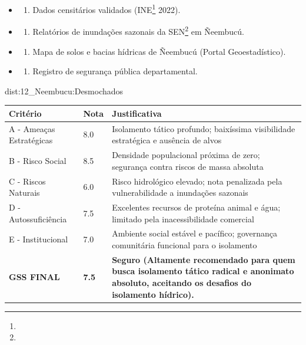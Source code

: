 {\begin{itemize}
\tightlist
\item
  \begin{enumerate}
  \def\labelenumi{\arabic{enumi})}
  \tightlist
  \item
    Dados censitários validados (INE\footnote{\fineINE} 2022).
  \end{enumerate}
\item
  \begin{enumerate}
  \def\labelenumi{\arabic{enumi})}
  \setcounter{enumi}{1}
  \tightlist
  \item
    Relatórios de inundações sazonais da SEN\footnote{\fineSEN} em Ñeembucú.
  \end{enumerate}
\item
  \begin{enumerate}
  \def\labelenumi{\arabic{enumi})}
  \setcounter{enumi}{2}
  \tightlist
  \item
    Mapa de solos e bacias hídricas de Ñeembucú (Portal Geoestadístico).
  \end{enumerate}
\item
  \begin{enumerate}
  \def\labelenumi{\arabic{enumi})}
  \setcounter{enumi}{3}
  \tightlist
  \item
    Registro de segurança pública departamental.
  \end{enumerate}
\end{itemize}}{dist:12_Neembucu:Desmochados}
\begin{table}[ht!]
\small \begin{tabular}{p{3.0cm}p{0.8cm}p{6.0cm}} \toprule
\textbf{Critério} & \textbf{Nota} & \textbf{Justificativa} \\ \midrule
A - Ameaças Estratégicas & 8.0 & Isolamento tático profundo; baixíssima visibilidade estratégica e ausência de alvos \\
B - Risco Social & 8.5 & Densidade populacional próxima de zero; segurança contra riscos de massa absoluta \\
C - Riscos Naturais & 6.0 & Risco hidrológico elevado; nota penalizada pela vulnerabilidade a inundações sazonais \\
D - Autossuficiência & 7.5 & Excelentes recursos de proteína animal e água; limitado pela inacessibilidade comercial \\
E - Institucional & 7.0 & Ambiente social estável e pacífico; governança comunitária funcional para o isolamento \\
\midrule \textbf{GSS FINAL} & \textbf{7.5} & \textbf{Seguro (Altamente recomendado para quem busca isolamento tático radical e anonimato absoluto, aceitando os desafios do isolamento hídrico).} \\ \bottomrule \end{tabular}
\end{table}
